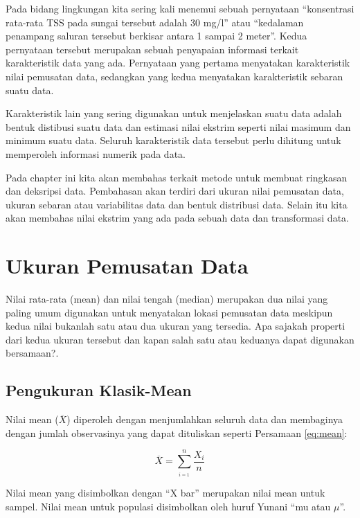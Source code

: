 \documentclass[]{book}
\begin{document}
Pada bidang lingkungan kita sering kali menemui sebuah pernyataan
``konsentrasi rata-rata TSS pada sungai tersebut adalah 30 mg/l'' atau
``kedalaman penampang saluran tersebut berkisar antara 1 sampai 2
meter''. Kedua pernyataan tersebut merupakan sebuah penyapaian informasi
terkait karakteristik data yang ada. Pernyataan yang pertama menyatakan
karakteristik nilai pemusatan data, sedangkan yang kedua menyatakan
karakteristik sebaran suatu data.

Karakteristik lain yang sering digunakan untuk menjelaskan suatu data
adalah bentuk distibusi suatu data dan estimasi nilai ekstrim seperti
nilai masimum dan minimum suatu data. Seluruh karakteristik data
tersebut perlu dihitung untuk memperoleh informasi numerik pada data.

Pada chapter ini kita akan membahas terkait metode untuk membuat
ringkasan dan deksripsi data. Pembahasan akan terdiri dari ukuran nilai
pemusatan data, ukuran sebaran atau variabilitas data dan bentuk
distribusi data. Selain itu kita akan membahas nilai ekstrim yang ada
pada sebuah data dan transformasi data.

\section{Ukuran Pemusatan Data}\label{ukuran-pemusatan-data}

Nilai rata-rata (mean) dan nilai tengah (median) merupakan dua nilai
yang paling umum digunakan untuk menyatakan lokasi pemusatan data
meskipun kedua nilai bukanlah satu atau dua ukuran yang tersedia. Apa
sajakah properti dari kedua ukuran tersebut dan kapan salah satu atau
keduanya dapat digunakan bersamaan?.

\subsection{Pengukuran Klasik-Mean}\label{pengukuran-klasik-mean}

Nilai mean (\(\overline{X}\)) diperoleh dengan menjumlahkan seluruh data
dan membaginya dengan jumlah observasinya yang dapat dituliskan seperti
Persamaan \eqref{eq:mean}:

\begin{equation}
  \overline{X}=\text{}\sum_{_{i=1}}^n\frac{X_i}{n}
  \label{eq:mean}
\end{equation}

Nilai mean yang disimbolkan dengan ``X bar'' merupakan nilai mean untuk
sampel. Nilai mean untuk populasi disimbolkan oleh huruf Yunani ``mu
atau \(\mu\)''.
\end{document}
